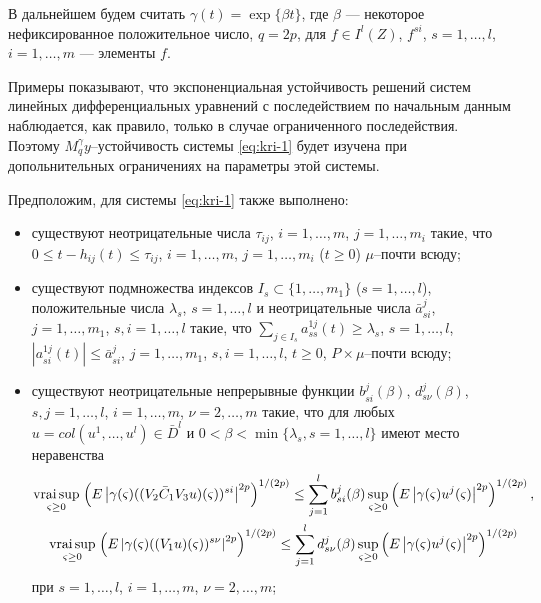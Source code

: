 В дальнейшем будем считать $\gamma (t) = \exp \{\beta t\}$, где
$\beta$ --- некоторое  нефиксированное положительное число, $q =
2p$, для  $f \in I^l(Z)$,
 $f^{si}$, $s = 1,\dots,l$, $i = 1,\dots,m$ --- элементы $f$.

Примеры показывают, что экспоненциальная устойчивость решений систем
линейных дифференциальных уравнений с последействием по начальным
данным наблюдается, как правило, только в случае ограниченного
последействия. Поэтому $M_q^\gamma y$--устойчивость системы \eqref{eq:kri-1}
будет изучена при допольнительных ограничениях  на параметры этой
системы.

Предположим, для системы \eqref{eq:kri-1} также выполнено:
\begin{itemize}
    \item существуют неотрицательные числа $\tau_{ij}$, $i = 1,\dots,m$, $j =
    1,\dots,m_i$ такие, что $0 \leq
     t- h_{ij}(t) \leq \tau _{ij}$, $i = 1,\dots,m$, $j = 1,\dots,m_i$ ($t
     \geq 0$) $\mu $--почти всюду;

    \item  существуют подмножества индексов $I_s \subset \{1,\dots, m_1\}$ ($s
    = 1,\dots, l$), положительные числа  $ \lambda _s$, $s = 1, \dots, l$ и
    неотрицательные числа $\bar a_{si}^j$, $j = 1, \dots, m_1$, $s,i = 1,
     \dots, l$ такие, что $\sum \limits_{j\in I_s}a^{1j}_{ss}(t) \geq
     \lambda _s$, $s = 1,\dots,l$, $|a^{1j}_{si}(t)|\leq \bar a^j_{si}$, $j =
     1,\dots,m_1$, $s,i = 1, \dots, l$, $t \geq 0$, $P\times\mu$--почти
    всюду;

    \item  существуют неотрицательные непрерывные функции $b_{si}^j(\beta)$,
    $d_{s\nu}^j(\beta)$, $s, j = 1, \dots, l$, $i = 1, \dots, m$, $\nu = 2,
    \dots, m$ такие, что для любых $u = col (u^1, \dots, u^l) \in \bar D^l$
    и $0<\beta < \min \{\lambda _s, s = 1, \dots, l \}$ имеют  место
    неравенства
     \begin{gather*}
      \mathrel {\mathop
     {\operatorname*{vrai} \sup} \limits _{\varsigma \geq 0}} \left(E\left |\gamma
    (\varsigma)((V_2\bar C_1V_3 u)(\varsigma ))^{si}\right |^{2p}\right)^{1/(2p)} \leq \sum \limits_{j=1}^lb_{si}^j(\beta)\sup \limits
    _{\varsigma \geq 0}\left (E\left |\gamma
    (\varsigma)u^j(\varsigma)\right |^{2p}\right )^{1/(2p)},\\
    \mathrel {\mathop
     {\operatorname*{vrai} \sup}\limits _{\varsigma \geq 0}} \left(E\left |\gamma
    (\varsigma)((V_1 u)(\varsigma ))^{s\nu}\right |^{2p}\right)^{1/(2p)} \leq \sum \limits_{j=1}^ld_{s\nu}^j(\beta)\sup \limits
    _{\varsigma \geq 0}\left (E\left |\gamma
    (\varsigma)u^j(\varsigma)\right |^{2p}\right )^{1/(2p)}
    \end{gather*} при $s = 1,\dots,l$, $i = 1, \dots, m $, $\nu = 2, \dots, m$;


\end{itemize}
